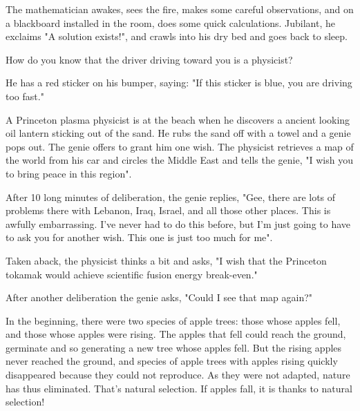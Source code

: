 The mathematician awakes, sees the fire, makes some careful observations, and on a blackboard installed in the room, does some quick calculations. Jubilant, he exclaims "A solution exists!", and crawls into his dry bed and goes back to sleep.
	\begin{center}\underline{\hspace{5 cm}}\end{center}

How do you know that the driver driving toward you is a physicist?

He has a red sticker on his bumper, saying: "If this sticker is blue, you are driving too fast."
	\begin{center}\underline{\hspace{5 cm}}\end{center}

A Princeton plasma physicist is at the beach when he discovers a ancient looking oil lantern sticking out of the sand. He rubs the sand off with a towel and a genie pops out. The genie offers to grant him one wish. The physicist retrieves a map of the world from his car and circles the Middle East and tells the genie, "I wish you to bring peace in this region".

After 10 long minutes of deliberation, the genie replies, "Gee, there are lots of problems there with Lebanon, Iraq, Israel, and all those other places. This is awfully embarrassing. I've never had to do this before, but I'm just going to have to ask you for another wish. This one is just too much for me".

Taken aback, the physicist thinks a bit and asks, "I wish that the Princeton tokamak would achieve scientific fusion energy break-even."

After another deliberation the genie asks, "Could I see that map again?"	
	\begin{center}\underline{\hspace{5 cm}}\end{center}

In the beginning, there were two species of apple trees: those whose apples fell, and those whose apples were rising. The apples that fell could reach the ground, germinate and so generating a new tree whose apples fell. But the rising apples never reached the ground, and species of apple trees with apples rising quickly disappeared because they could not reproduce. As they were not adapted, nature has thus eliminated. That's natural selection. If apples fall, it is thanks to natural selection!

